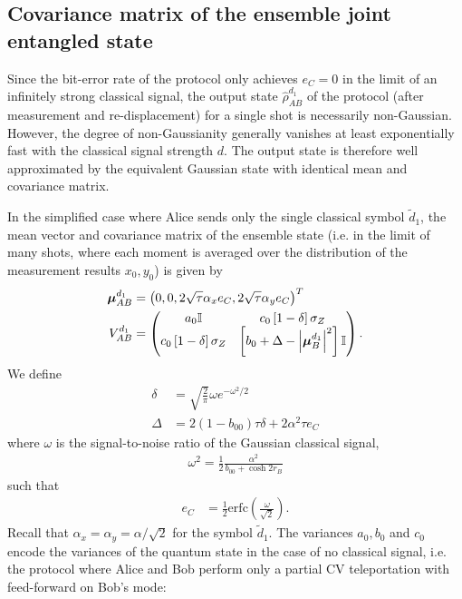 \documentclass[%
 reprint,
 superscriptaddress,
 amsmath,
 amssymb,
 aps,
 pra,
]{revtex4-2}
\newcommand{\id}{\mathbb{I}}
\newcommand{\sz}{\sigma_Z}
\begin{document}
\subsection{Covariance matrix of the ensemble joint entangled state}
Since the bit-error rate of the protocol only achieves $e_C = 0$ in the limit of an infinitely strong classical signal, the output state $\hat \rho_{AB}^{d_1}$ of the protocol (after measurement and re-displacement) for a single shot is necessarily non-Gaussian. However, the degree of non-Gaussianity generally vanishes at least exponentially fast with the classical signal strength $d$. The output state is therefore well approximated by the equivalent Gaussian state with identical mean and covariance matrix.

In the simplified case where Alice sends only the single classical symbol $\tilde d_1$, the mean vector and covariance matrix of the ensemble state (i.e. in the limit of many shots, where each moment is averaged over the distribution of the measurement results $x_0, y_0$) is given by
\begin{align}
    \bm{\mu}_{AB}^{d_1} &= \left( 0, 0, 2 \sqrt{\tau} \alpha_x e_C, 2 \sqrt{\tau} \alpha_y e_C \right)^T \\
    V_{AB}^{d_1} &= \begin{pmatrix}
            a_{0} \id & c_0 \left[ 1 - \delta\right]\sz \\
            c_0 \left[ 1 - \delta \right]\sz & \left[b_0 + \Delta - \abs{\bm{\mu}_{B}^{d_1}}^2 \right] \id
        \end{pmatrix}.
\end{align}
We define
\begin{align}
    \delta &= \sqrt{\frac{2}{\pi}}\omega e^{-{\omega^2}/{2}} \\
    \Delta &= 2(1-b_{00}) \tau \delta + 2 \alpha^2\tau e_C
\end{align}
where $\omega$ is the signal-to-noise ratio of the Gaussian classical signal,
\begin{align}
    \omega^2 = \frac{1}{2}\frac{\alpha^2}{b_{00} + \cosh 2r_B}
\end{align}
such that
\begin{align}
    e_C &= \frac{1}{2} \mathrm{erfc} \left( \frac{\omega}{\sqrt{2}} \right).
\end{align}
Recall that $\alpha_x = \alpha_y = \alpha / \sqrt{2}$ for the symbol $\tilde d_1$. The variances $a_0, b_0$ and $c_0$ encode the variances of the quantum state in the case of no classical signal, i.e. the protocol where Alice and Bob perform only a partial CV teleportation with feed-forward on Bob's mode:
\end{document}
